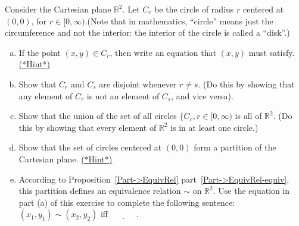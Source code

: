 \begin{exercise}{67}
Consider the Cartesian plane $\mathbb{R}^2$. Let $C_r$ be the circle of radius $r$ centered at $(0,0)$, for $r \in [0,\infty)$.(Note that in mathematics, ``circle'' means just the circumference and not the interior: the interior of the circle is called a ``disk''.)
\begin{enumerate}[(a)]
\item
If the point $(x,y) \in C_r$, then write an equation that $(x,y)$ must satisfy.
\hyperref[sec:EquivalenceRelationsChap:hints]{(*Hint*)}
\item
Show that $C_{r}$ and $C_{s}$ are disjoint whenever $r \neq s$. (Do this by showing that any element of $C_{r}$ is not an element of $C_{s}$, and vice versa).
\item
Show that the union of the set of all circles $\{C_r, r \in [0,\infty)$ is all of $\mathbb{R}^2$. (Do this by showing that every element of $\mathbb{R}^2$ is in at least one circle.)
\item
Show that the set of circles centered at $(0,0)$ form a partition of the Cartesian plane.
\hyperref[sec:EquivalenceRelationsChap:hints]{(*Hint*)}
\item
According to Proposition~\ref{Part->EquivRel} part~\ref{Part->EquivRel-equiv}, this partition  defines an equivalence relation $\sim$ on $\mathbb{R}^2$. Use the equation in part (a) of this exercise to complete the following sentence:  $(x_1,y_1) \sim (x_2,y_2)$ iff $\underline{~~~~~~~~~~~~~~}$.
\end{enumerate}
\end{exercise}





